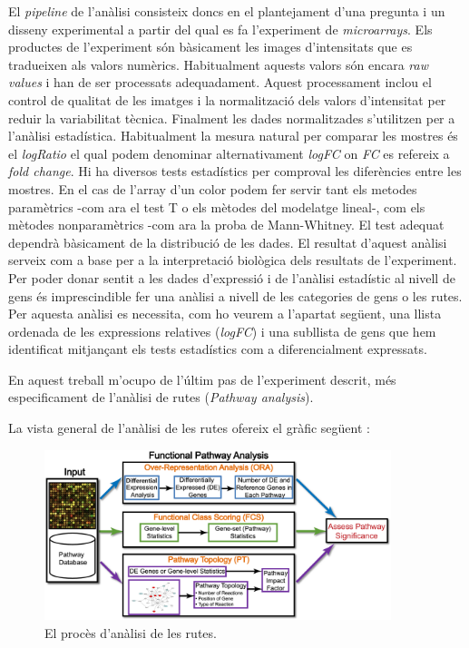 El \textit{pipeline} de l'anàlisi consisteix doncs en el plantejament d'una pregunta i un disseny experimental a partir del qual es fa l'experiment de \textit{microarrays}. Els productes de l'experiment són bàsicament les images d'intensitats que es tradueixen als valors numèrics. Habitualment aquests valors són encara \textit{raw values} i han de ser processats adequadament. Aquest processament inclou el control de qualitat de les imatges i la normalització dels valors d'intensitat per reduir la variabilitat tècnica. Finalment les dades normalitzades s'utilitzen per a l'anàlisi estadística. Habitualment la mesura natural per comparar les mostres és el \textit{logRatio} el qual podem denominar alternativament \textit{\gls{logFC}} on \textit{FC} es refereix a \textit{fold change}. Hi ha diversos tests estadístics per comproval les diferències entre les mostres. En el cas de l'array d'un color podem fer servir tant els metodes paramètrics -com ara el test T o els mètodes del modelatge lineal-, com els mètodes nonparamètrics -com ara la proba de Mann-Whitney. El test adequat dependrà bàsicament de la distribució de les dades. El resultat d'aquest anàlisi serveix com a base per a la interpretació biològica dels resultats de l'experiment. Per poder donar sentit a les dades d'expressió i de l'anàlisi estadístic al nivell de gens és imprescindible fer una anàlisi a nivell de les categories de gens o les rutes. Per aquesta anàlisi es necessita, com ho veurem a l'apartat següent, una llista ordenada de les expressions relatives (\textit{\gls{logFC}}) i una subllista de gens que hem identificat mitjançant els tests estadístics com a diferencialment expressats.

En aquest treball m'ocupo de l'últim pas de l'experiment descrit, més especificament de l'anàlisi de rutes (\textit{Pathway analysis}).

La vista general de l'anàlisi de les rutes ofereix el gràfic següent  \cite{khatri2012ten}:

\begin{figure}[H]
\centering
\includegraphics[width=0.9\textwidth]{figures/Pipeline_Pathway.png} 
\caption{El procès d'anàlisi de les rutes.}
\end{figure}

